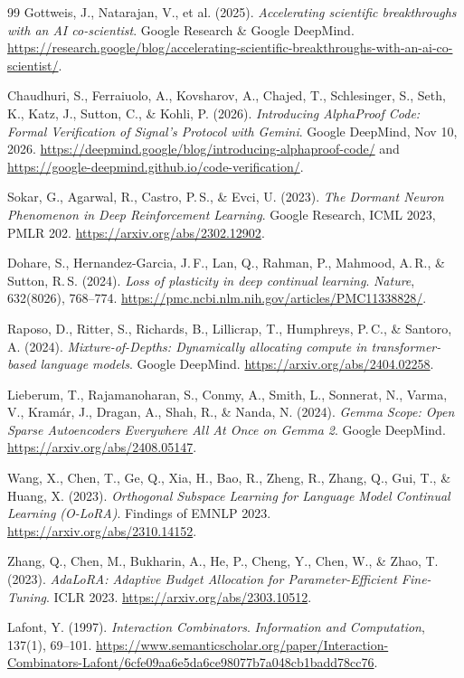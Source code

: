 \documentclass[10pt,a4paper]{article}
\begin{document}
\begin{thebibliography}{99}
Gottweis, J., Natarajan, V., et al. (2025). \emph{Accelerating scientific breakthroughs with an AI co-scientist}. Google Research \& Google DeepMind. \url{https://research.google/blog/accelerating-scientific-breakthroughs-with-an-ai-co-scientist/}.

Chaudhuri, S., Ferraiuolo, A., Kovsharov, A., Chajed, T., Schlesinger, S., Seth, K., Katz, J., Sutton, C., \& Kohli, P. (2026). \emph{Introducing AlphaProof Code: Formal Verification of Signal's Protocol with Gemini}. Google DeepMind, Nov 10, 2026. \url{https://deepmind.google/blog/introducing-alphaproof-code/} and \url{https://google-deepmind.github.io/code-verification/}.

Sokar, G., Agarwal, R., Castro, P.\,S., \& Evci, U. (2023). \emph{The Dormant Neuron Phenomenon in Deep Reinforcement Learning}. Google Research, ICML 2023, PMLR 202. \url{https://arxiv.org/abs/2302.12902}.

Dohare, S., Hernandez-Garcia, J.\,F., Lan, Q., Rahman, P., Mahmood, A.\,R., \& Sutton, R.\,S. (2024). \emph{Loss of plasticity in deep continual learning}. \emph{Nature}, 632(8026), 768--774. \url{https://pmc.ncbi.nlm.nih.gov/articles/PMC11338828/}.

Raposo, D., Ritter, S., Richards, B., Lillicrap, T., Humphreys, P.\,C., \& Santoro, A. (2024). \emph{Mixture-of-Depths: Dynamically allocating compute in transformer-based language models}. Google DeepMind. \url{https://arxiv.org/abs/2404.02258}.

Lieberum, T., Rajamanoharan, S., Conmy, A., Smith, L., Sonnerat, N., Varma, V., Kram\'ar, J., Dragan, A., Shah, R., \& Nanda, N. (2024). \emph{Gemma Scope: Open Sparse Autoencoders Everywhere All At Once on Gemma 2}. Google DeepMind. \url{https://arxiv.org/abs/2408.05147}.

Wang, X., Chen, T., Ge, Q., Xia, H., Bao, R., Zheng, R., Zhang, Q., Gui, T., \& Huang, X. (2023). \emph{Orthogonal Subspace Learning for Language Model Continual Learning (O-LoRA)}. Findings of EMNLP 2023. \url{https://arxiv.org/abs/2310.14152}.

Zhang, Q., Chen, M., Bukharin, A., He, P., Cheng, Y., Chen, W., \& Zhao, T. (2023). \emph{AdaLoRA: Adaptive Budget Allocation for Parameter-Efficient Fine-Tuning}. ICLR 2023. \url{https://arxiv.org/abs/2303.10512}.

Lafont, Y. (1997). \emph{Interaction Combinators}. \emph{Information and Computation}, 137(1), 69--101. \url{https://www.semanticscholar.org/paper/Interaction-Combinators-Lafont/6cfe09aa6e5da6ce98077b7a048cb1badd78cc76}.
\end{thebibliography}
\end{document}
